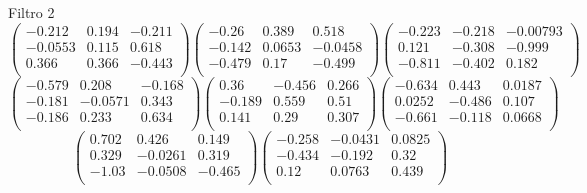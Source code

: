Filtro 2
{ \small
\[
\begin{pmatrix}
  -0.212 & 0.194 & -0.211 \\
  -0.0553 & 0.115 & 0.618 \\
  0.366 & 0.366 & -0.443 \\
\end{pmatrix}
\begin{pmatrix}
  -0.26 & 0.389 & 0.518 \\
  -0.142 & 0.0653 & -0.0458 \\
  -0.479 & 0.17 & -0.499 \\
\end{pmatrix}
\begin{pmatrix}
  -0.223 & -0.218 & -0.00793 \\
  0.121 & -0.308 & -0.999 \\
  -0.811 & -0.402 & 0.182 \\
\end{pmatrix}
\]
\[
\begin{pmatrix}
  -0.579 & 0.208 & -0.168 \\
  -0.181 & -0.0571 & 0.343 \\
  -0.186 & 0.233 & 0.634 \\
\end{pmatrix}
\begin{pmatrix}
  0.36 & -0.456 & 0.266 \\
  -0.189 & 0.559 & 0.51 \\
  0.141 & 0.29 & 0.307 \\
\end{pmatrix}
\begin{pmatrix}
  -0.634 & 0.443 & 0.0187 \\
  0.0252 & -0.486 & 0.107 \\
  -0.661 & -0.118 & 0.0668 \\
\end{pmatrix}
\]
\[
\begin{pmatrix}
  0.702 & 0.426 & 0.149 \\
  0.329 & -0.0261 & 0.319 \\
  -1.03 & -0.0508 & -0.465 \\
\end{pmatrix}
\begin{pmatrix}
  -0.258 & -0.0431 & 0.0825 \\
  -0.434 & -0.192 & 0.32 \\
  0.12 & 0.0763 & 0.439 \\
\end{pmatrix}
\]
}

